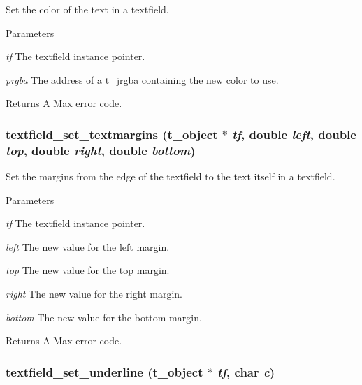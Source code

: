 Set the color of the text in a textfield. 
\begin{DoxyParams}{Parameters}
\item[{\em tf}]The textfield instance pointer. \item[{\em prgba}]The address of a \hyperlink{structt__jrgba}{t\_\-jrgba} containing the new color to use. \end{DoxyParams}
\begin{DoxyReturn}{Returns}
A Max error code. 
\end{DoxyReturn}
\hypertarget{group__textfield_gaf04aceca2e8f20fed28a567d64822698}{
\subsubsection[{textfield\_\-set\_\-textmargins}]{ textfield\_\-set\_\-textmargins ({\bf t\_\-object} $\ast$ {\em tf}, \/  double {\em left}, \/  double {\em top}, \/  double {\em right}, \/  double {\em bottom})}}
\label{group__textfield_gaf04aceca2e8f20fed28a567d64822698}


Set the margins from the edge of the textfield to the text itself in a textfield. 
\begin{DoxyParams}{Parameters}
\item[{\em tf}]The textfield instance pointer. \item[{\em left}]The new value for the left margin. \item[{\em top}]The new value for the top margin. \item[{\em right}]The new value for the right margin. \item[{\em bottom}]The new value for the bottom margin. \end{DoxyParams}
\begin{DoxyReturn}{Returns}
A Max error code. 
\end{DoxyReturn}
\hypertarget{group__textfield_gafd1fa42ebe95f4ff0e4d6c2073e4d3c7}{
\subsubsection[{textfield\_\-set\_\-underline}]{ textfield\_\-set\_\-underline ({\bf t\_\-object} $\ast$ {\em tf}, \/  char {\em c})}}
\label{group__textfield_gafd1fa42ebe95f4ff0e4d6c2073e4d3c7}


